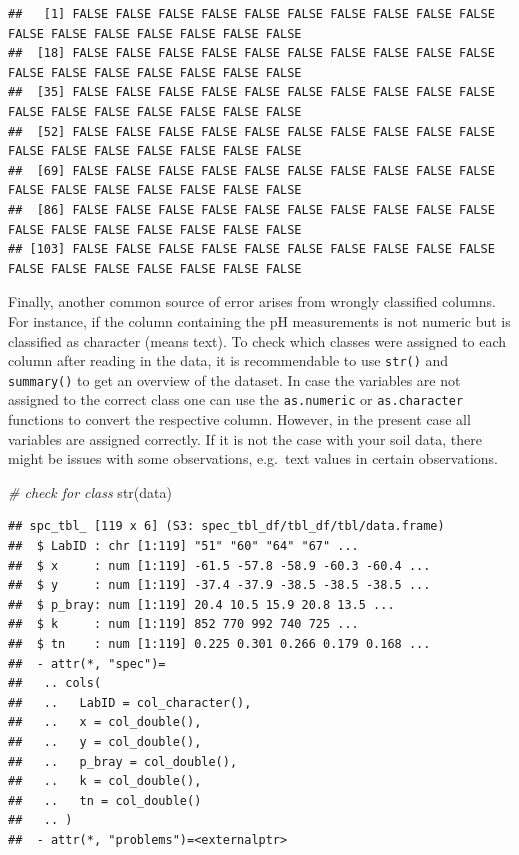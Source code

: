 \documentclass[
  10pt,
  b5paper,
  oneside]{book}
\newenvironment{Shaded}{\begin{snugshade}}{\end{snugshade}}
\newcommand{\CommentTok}[1]{\textcolor[rgb]{0.56,0.35,0.01}{\textit{#1}}}
\newcommand{\FunctionTok}[1]{\textcolor[rgb]{0.00,0.00,0.00}{#1}}
\newcommand{\NormalTok}[1]{#1}
\newcommand{\OtherTok}[1]{\textcolor[rgb]{0.56,0.35,0.01}{#1}}
\newcommand{\SpecialCharTok}[1]{\textcolor[rgb]{0.00,0.00,0.00}{#1}}
\begin{document}
\begin{verbatim}
##   [1] FALSE FALSE FALSE FALSE FALSE FALSE FALSE FALSE FALSE FALSE FALSE FALSE FALSE FALSE FALSE FALSE FALSE
##  [18] FALSE FALSE FALSE FALSE FALSE FALSE FALSE FALSE FALSE FALSE FALSE FALSE FALSE FALSE FALSE FALSE FALSE
##  [35] FALSE FALSE FALSE FALSE FALSE FALSE FALSE FALSE FALSE FALSE FALSE FALSE FALSE FALSE FALSE FALSE FALSE
##  [52] FALSE FALSE FALSE FALSE FALSE FALSE FALSE FALSE FALSE FALSE FALSE FALSE FALSE FALSE FALSE FALSE FALSE
##  [69] FALSE FALSE FALSE FALSE FALSE FALSE FALSE FALSE FALSE FALSE FALSE FALSE FALSE FALSE FALSE FALSE FALSE
##  [86] FALSE FALSE FALSE FALSE FALSE FALSE FALSE FALSE FALSE FALSE FALSE FALSE FALSE FALSE FALSE FALSE FALSE
## [103] FALSE FALSE FALSE FALSE FALSE FALSE FALSE FALSE FALSE FALSE FALSE FALSE FALSE FALSE FALSE FALSE FALSE
\end{verbatim}

\begin{Shaded}
\end{Shaded}

Finally, another common source of error arises from wrongly classified columns. For instance, if the column containing the pH measurements is not numeric but is classified as character (means text). To check which classes were assigned to each column after reading in the data, it is recommendable to use \texttt{str()} and \texttt{summary()} to get an overview of the dataset.
In case the variables are not assigned to the correct class one can use the \texttt{as.numeric} or \texttt{as.character} functions to convert the respective column. However, in the present case all variables are assigned correctly. If it is not the case with your soil data, there might be issues with some observations, e.g.~text values in certain observations.

\begin{Shaded}
\begin{Highlighting}[]
\CommentTok{\# check for class}
\FunctionTok{str}\NormalTok{(data)}
\end{Highlighting}
\end{Shaded}

\begin{verbatim}
## spc_tbl_ [119 x 6] (S3: spec_tbl_df/tbl_df/tbl/data.frame)
##  $ LabID : chr [1:119] "51" "60" "64" "67" ...
##  $ x     : num [1:119] -61.5 -57.8 -58.9 -60.3 -60.4 ...
##  $ y     : num [1:119] -37.4 -37.9 -38.5 -38.5 -38.5 ...
##  $ p_bray: num [1:119] 20.4 10.5 15.9 20.8 13.5 ...
##  $ k     : num [1:119] 852 770 992 740 725 ...
##  $ tn    : num [1:119] 0.225 0.301 0.266 0.179 0.168 ...
##  - attr(*, "spec")=
##   .. cols(
##   ..   LabID = col_character(),
##   ..   x = col_double(),
##   ..   y = col_double(),
##   ..   p_bray = col_double(),
##   ..   k = col_double(),
##   ..   tn = col_double()
##   .. )
##  - attr(*, "problems")=<externalptr>
\end{verbatim}
\end{document}

